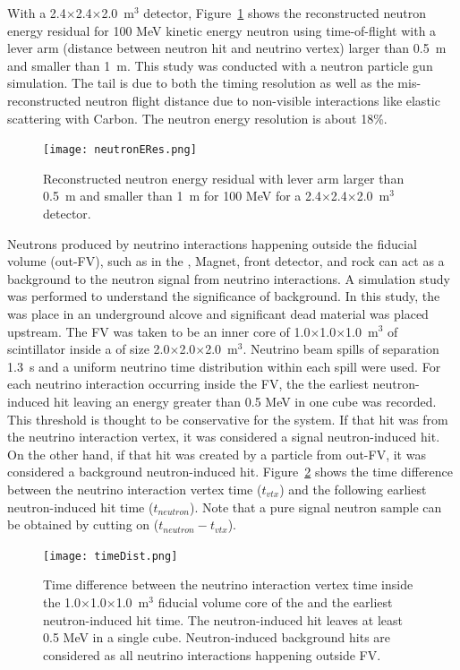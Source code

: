 With a 2.4$\times$2.4$\times$2.0~m$^{3}$  detector, Figure~\ref{fig:nProposal_4} shows 
the reconstructed neutron energy residual for 100 MeV kinetic energy neutron using time-of-flight with a lever arm (distance between neutron hit and neutrino vertex) larger than 0.5~m and smaller than 1~m.
This study was conducted with a neutron particle gun simulation.
The tail is due to both the timing resolution as well as the mis-reconstructed neutron flight distance due to non-visible interactions like elastic scattering with Carbon.
The neutron energy resolution is about 18\%. \\
\begin{figure}
\begin{center}
  \texttt{[image: neutronERes.png]}
\caption{\label{fig:nProposal_4} Reconstructed neutron energy residual with lever arm larger than 0.5~m and smaller than 1~m for 100 MeV for a 2.4$\times$2.4$\times$2.0~m$^{3}$  detector. } 
\end{center}
\end{figure}

 Neutrons produced by neutrino interactions happening outside the  fiducial volume (out-FV), such as in the , Magnet, front detector, and rock can act as a background to the neutron signal from neutrino interactions. 
A simulation study was performed to understand the significance of background. In this study, the  was place in an underground alcove and significant dead material was placed upstream.  The FV was taken to be an inner core of 1.0$\times$1.0$\times$1.0~m$^{3}$ of scintillator inside a  of size 2.0$\times$2.0$\times$2.0~m$^{3}$.  Neutrino beam spills of separation 1.3~s and a uniform neutrino time distribution within each spill were used.
For each neutrino interaction occurring inside the FV, the 
 the earliest neutron-induced hit leaving an energy greater than 0.5 MeV in one cube was recorded. This threshold is thought to be conservative for the  system.  If that hit was from the neutrino interaction vertex, it was considered a signal neutron-induced hit. On the other hand, if that hit was created by a particle from out-FV, it was considered a background neutron-induced hit.
Figure~\ref{fig:neutronBG1} shows the time difference between the neutrino interaction vertex time ($t_{vtx}$) and the following earliest neutron-induced hit time ($t_{neutron}$). 
Note that a pure signal neutron sample can be obtained by cutting on ($t_{neutron} - t_{vtx}$). 
\begin{figure}
\begin{center}
  \texttt{[image: timeDist.png]}
\caption{\label{fig:neutronBG1} Time difference between the neutrino interaction vertex time inside the 1.0$\times$1.0$\times$1.0~m$^{3}$ fiducial volume core of the  and the earliest neutron-induced hit time. The neutron-induced hit leaves at least 0.5 MeV in a single cube. Neutron-induced background hits are considered as all neutrino interactions happening outside FV.
} 
\end{center}
\end{figure}

